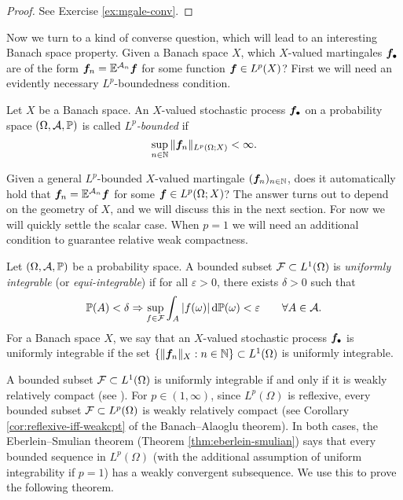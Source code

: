 \begin{proof}
  See Exercise \ref{ex:mgale-conv}.
\end{proof}

Now we turn to a kind of converse question, which will lead to an interesting Banach space property.
Given a Banach space $X$, which $X$-valued martingales $\bm{f}_{\bullet}$ are of the form $\bm{f}_{n} = \mathbb{E}^{\mathcal{A}_{n}} \bm{f}$ for some function $\bm{f} \in L^p(X)$?
First we will need an evidently necessary $L^p$-boundedness condition.

\begin{defn}
  Let $X$ be a Banach space.
  An $X$-valued stochastic process $\bm{f}_{\bullet}$ on a probability space $(\Omega,\mathcal{A},\mathbb{P})$ is called \emph{$L^p$-bounded} if
  \begin{equation*}
    \sup_{n \in \mathbb{N}} \|\bm{f}_n\|_{L^p(\Omega;X)} < \infty.
  \end{equation*}
\end{defn}

Given a general $L^p$-bounded $X$-valued martingale $(\bm{f}_n)_{n \in \mathbb{N}}$, does it automatically hold that $\bm{f}_n = \mathbb{E}^{\mathcal{A}_n} \bm{f}$ for some $\bm{f} \in L^p(\Omega;X)$?
The answer turns out to depend on the geometry of $X$, and we will discuss this in the next section.
For now we will quickly settle the scalar case.
When $p=1$ we will need an additional condition to guarantee relative weak compactness.

\begin{defn}\label{defn:UI}
  Let $(\Omega,\mathcal{A},\mathbb{P})$ be a probability space.
  A bounded subset $\mathcal{F} \subset L^1(\Omega)$ is \emph{uniformly integrable} (or \emph{equi-integrable}) if for all $\varepsilon > 0$, there exists $\delta > 0$ such that
  \begin{equation*}
    \mathbb{P}(A) < \delta \Rightarrow \sup_{f \in \mathcal{F}} \int_{A} |f(\omega)| \, \mathrm{d}\mathbb{P}(\omega) < \varepsilon \qquad \forall A \in \mathcal{A}.
  \end{equation*}
  For a Banach space $X$, we say that an $X$-valued stochastic process $\bm{f}_{\bullet}$ is uniformly integrable if the set $\{\|\bm{f}_n\|_{X} : n \in \mathbb{N}\} \subset L^1(\Omega)$ is uniformly integrable. 
\end{defn}

A bounded subset $\mathcal{F} \subset L^1(\Omega)$ is uniformly integrable if and only if it is weakly relatively compact (see \cite[Theorem 5.2.9]{AK06}).
For $p \in (1,\infty)$, since $L^p(\Omega)$ is reflexive, every bounded subset $\mathcal{F} \subset L^p(\Omega)$ is weakly relatively compact (see Corollary \ref{cor:reflexive-iff-weakcpt} of the Banach--Alaoglu theorem).
In both cases, the Eberlein--Smulian theorem (Theorem \ref{thm:eberlein-smulian}) says that every bounded sequence in $L^p(\Omega)$ (with the additional assumption of uniform integrability if $p=1$) has a weakly convergent subsequence.
We use this to prove the following theorem.

